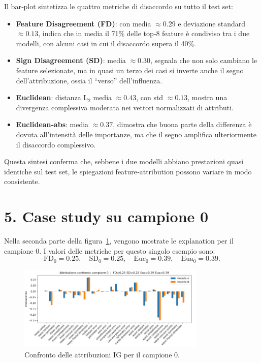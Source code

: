 \documentclass[a4paper,11pt]{article}
\begin{document}
Il bar‐plot sintetizza le quattro metriche di disaccordo su tutto il test set:
\begin{itemize}
  \item \textbf{Feature Disagreement (FD)}: con media $\approx0.29$ e deviazione standard $\approx0.13$, indica che in media il 71\% delle top‐8 feature è condiviso tra i due modelli, con alcuni casi in cui il disaccordo supera il 40\%.
  \item \textbf{Sign Disagreement (SD)}: media $\approx0.30$, segnala che non solo cambiano le feature selezionate, ma in quasi un terzo dei casi si inverte anche il segno dell’attribuzione, ossia il “verso” dell’influenza.
  \item \textbf{Euclidean}: distanza L$_2$ media $\approx0.43$, con std $\approx0.13$, mostra una divergenza complessiva moderata nei vettori normalizzati di attributi.
  \item \textbf{Euclidean‐abs}: media $\approx0.37$, dimostra che buona parte della differenza è dovuta all’intensità delle importanze, ma che il segno amplifica ulteriormente il disaccordo complessivo.
\end{itemize}

Questa sintesi conferma che, sebbene i due modelli abbiano prestazioni quasi identiche sul test set, le spiegazioni feature‐attribution possono variare in modo consistente.


\section*{5. Case study su campione 0}
Nella seconda parte della figura~\ref{fig:global_vs_case}, vengono mostrate le explanation per il campione 0. I valori delle metriche per questo singolo esempio sono:
\[
\text{FD}_0 = 0.25,\quad
\text{SD}_0 = 0.25,\quad
\text{Euc}_0 = 0.39,\quad
\text{Eua}_0 = 0.39.
\]

\begin{figure}[htbp]
  \centering
  \includegraphics[width=0.8\textwidth]{campione zero.png}
  \caption{Confronto delle attribuzioni IG per il campione 0.}
  \label{fig:global_vs_case}
\end{figure}
\end{document}
